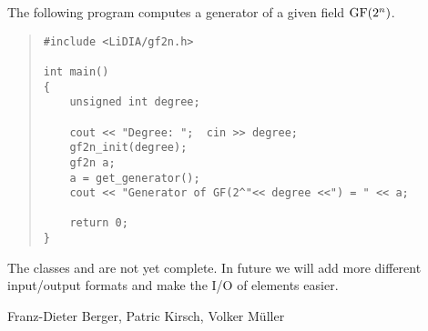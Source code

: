 
\EXAMPLES

The following program computes a generator of a given field $\mathrm{GF}(2^n)$.

\begin{quote}
\begin{verbatim}
#include <LiDIA/gf2n.h>

int main()
{
    unsigned int degree;

    cout << "Degree: ";  cin >> degree;
    gf2n_init(degree);
    gf2n a;
    a = get_generator();
    cout << "Generator of GF(2^"<< degree <<") = " << a;

    return 0;
}
\end{verbatim}
\end{quote}



\NOTES

The classes  and  are not yet complete.  In future we will add more
different input/output formats and make the I/O of  elements easier.



\AUTHOR

Franz-Dieter Berger, Patric Kirsch, Volker M\"uller

